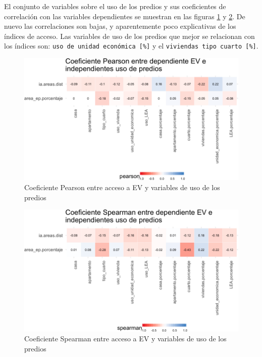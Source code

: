 \documentclass[12pt,a4paper,openany]{book}
\theoremstyle{definition}
\theoremstyle{definition}
\theoremstyle{definition}
\theoremstyle{remark}
\begin{document}
El conjunto de variables sobre el uso de los predios y sus coeficientes
de correlación con las variables dependientes se muestran en las figuras
\ref{fig:tile-ev-uso-pearson} y \ref{fig:tile-ev-uso-spearman}. De nuevo
las correlaciones son bajas, y aparentemente poco explicativas de los
índices de acceso. Las variables de uso de los predios que mejor se
relacionan con los índices son:
\texttt{uso\ de\ unidad\ económica\ {[}\%{]}} y el
\texttt{viviendas\ tipo\ cuarto\ {[}\%{]}}.

\begin{figure}[H]

{\centering \includegraphics[width=1\linewidth]{tesis-unigis_files/figure-latex/tile-ev-uso-pearson-1} 

}

\caption{Coeficiente Pearson entre acceso a EV y variables de uso de los predios}\label{fig:tile-ev-uso-pearson}
\end{figure}

\begin{figure}[H]

{\centering \includegraphics[width=1\linewidth]{tesis-unigis_files/figure-latex/tile-ev-uso-spearman-1} 

}

\caption{Coeficiente Spearman entre acceso a EV y variables de uso de los predios}\label{fig:tile-ev-uso-spearman}
\end{figure}
\end{document}
